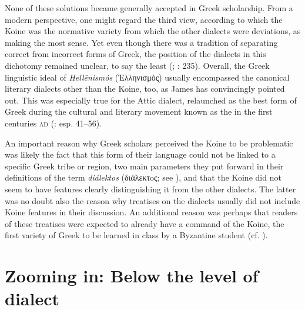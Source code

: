 None of these solutions became generally accepted in Greek scholarship. From a modern perspective, one might regard the third view, according to which the Koine was the normative variety from which the other dialects were deviations, as making the most sense. Yet even though there was a tradition of  separating correct from incorrect forms of Greek, the position of the dialects in this dichotomy remained unclear, to say the least (\citealt{Versteegh1986}; \citealt{Dickey2007}: 235). Overall, the Greek linguistic ideal of \textit{Hellēnismós} (Ἑλληνισμός) usually encompassed the canonical literary dialects other than the Koine, too, as James \citet{Clackson2015} has convincingly pointed out. This was especially true for the Attic dialect, relaunched as the best form of Greek during the cultural and literary movement known as the  in the first centuries \textsc{ad} (\citealt{Whitmarsh2005}: esp. 41–56).

An important reason why Greek scholars perceived the Koine to be problematic was likely the fact that this form of their language could not be linked to a specific Greek tribe or region, two main parameters they put forward in their definitions of the term \textit{diálektos} (διάλεκτoς; see \citealt{VanRooy2016d}), and that the Koine did not seem to have features clearly distinguishing it from the other dialects. The latter was no doubt also the reason why treatises on the dialects usually did not include Koine features in their discussion. An additional reason was perhaps that readers of these treatises were expected to already have a command of the Koine, the first variety of Greek to be learned in class by a Byzantine student (cf. \citealt{VanRooy2016b}).

\section{Zooming in: Below the level of dialect}\label{sec:2.4}

